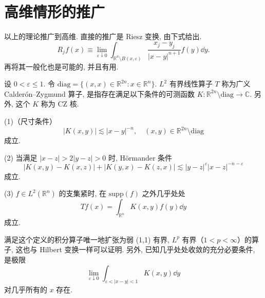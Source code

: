
\section{高维情形的推广}\label{sec:4.6}










以上的理论推广到高维. 直接的推广是 Riesz 变换, 由下式给出.
\begin{equation}\tag{4.41}
R_{j}f(x) \equiv \lim_{\varepsilon \downarrow 0}\int_{\mathbb{R}^{n}\setminus B(x, \varepsilon)}\frac{x_{j}-y_{j}}{|x-y|^{n+1}}f(y)\dd y.
\label{eq:4.41}
\end{equation}
再将其一般化也是可能的, 并且有用.

\begin{definition}\label{def:4.3}
设 $0 < \varepsilon \leq 1$. 令 $\mathrm{diag} = \{(x, x) \in \mathbb{R}^{2n} : x \in \mathbb{R}^{n}\}$. $L^{2}$ 有界线性算子 $T$ 称为广义 Calderón--Zygmund 算子, 是指存在满足以下条件的可测函数 $K: \mathbb{R}^{2n}\setminus\mathrm{diag} \to \mathbb{C}$. 另外, 这个 $K$ 称为 CZ 核.

(1)（尺寸条件）
\begin{equation}\tag{4.42}
|K(x, y)| \lesssim |x-y|^{-n}, \quad (x, y) \in \mathbb{R}^{2n}\setminus\mathrm{diag}
\label{eq:4.42}
\end{equation}
成立.

(2) 当满足 $|x-z| > 2|y-z| > 0$ 时, Hörmander 条件
\begin{equation}\tag{4.43}
|K(x, y) - K(x, z)| + |K(y, x) - K(z, x)| \lesssim |y-z|^{\varepsilon}|x-z|^{-n-\varepsilon}
\label{eq:4.43}
\end{equation}
成立.

(3) $f \in L^{2}(\mathbb{R}^{n})$ 的支集紧时, 在 $\mathrm{supp}(f)$ 之外几乎处处
\[
Tf(x) = \int_{\mathbb{R}^{n}}K(x, y)f(y)\dd y
\]
成立.
\end{definition}

满足这个定义的积分算子唯一地扩张为弱 (1,1) 有界, $L^{p}$ 有界（$1 < p < \infty$）的算子, 这也与 Hilbert 变换一样可以证明. 另外, 已知几乎处处收敛的充分必要条件, 是极限
\[
\lim_{\varepsilon \downarrow 0}\int_{\varepsilon < |x-y| < 1}K(x, y)\dd y
\]
对几乎所有的 $x$ 存在.

